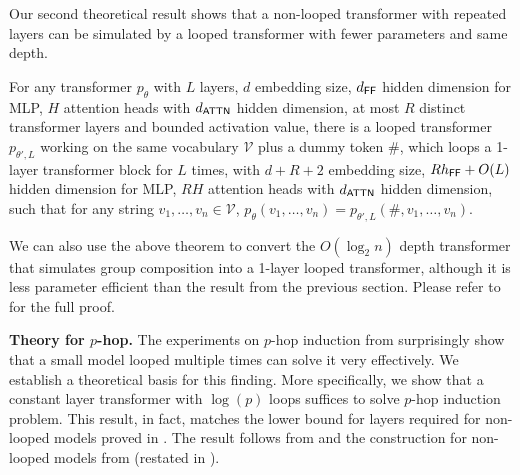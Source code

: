 Our second theoretical result shows that a non-looped transformer with repeated layers can be simulated by a looped transformer with fewer parameters and same depth.
\begin{theorem}\label{thm:main}
    For any transformer $p_{\theta}$ with $L$ layers, $d$ embedding size, $d_{\mathsf{FF}}$ hidden dimension for MLP, $H$ attention heads with $d_{\mathsf{ATTN}}$ hidden dimension, at most $R$ distinct transformer layers and bounded activation value, there is a looped transformer $p_{\theta',L}$ working on the same vocabulary $\mathcal{V}$ plus a dummy token $\#$, 
which loops a 1-layer transformer block for $L$ times, with $d+R+2$ embedding size, $R h_{\mathsf{FF}} +O(L)$ hidden dimension for MLP, $RH$ attention heads with $d_{\mathsf{ATTN}}$ hidden dimension, such that for any string $v_1,\ldots, v_n\in\mathcal{V}$, $p_{\theta}(v_1,\ldots,v_n) = p_{\theta',L}(\#, v_1,\ldots,v_n)$.
\end{theorem}
We can also use the above theorem to convert the $O(\log_2 n)$ depth transformer that simulates group composition into a 1-layer looped transformer, although it is less parameter efficient than the result from the previous section.
Please refer to   for the full proof.

\textbf{Theory for $p$-hop.} The experiments on $p$-hop induction from  surprisingly show that a small model looped multiple times can solve it very effectively. 
We establish a theoretical basis for this finding. More specifically, we show that a constant layer transformer with $\log(p)$ loops suffices to solve $p$-hop induction problem. This result, in fact, matches the lower bound for layers required for non-looped models proved in \citet{sanford2024transformers}.
The result follows from  and the construction for non-looped models from \citet{sanford2024transformers} (restated in ).

